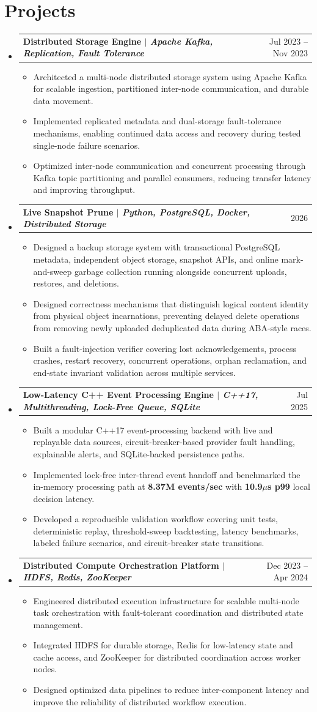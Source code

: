 \documentclass[letterpaper,10pt]{article}
\makeatletter
\newcommand{\resumeItem}[1]{\item\small{{#1\vspace{-2pt}}}}
\newcommand{\resumeProjectHeading}[2]{\item\begin{tabular*}{0.97\textwidth}{l@{\extracolsep{\fill}}r}\small\textbf{#1} & \small#2 \\\end{tabular*}\vspace{-7pt}}
\newcommand{\resumeSubHeadingListStart}{\begin{itemize}[leftmargin=0.12in,label={}]}
\newcommand{\resumeSubHeadingListEnd}{\end{itemize}}
\newcommand{\resumeItemListStart}{\begin{itemize}[leftmargin=0.18in]}
\newcommand{\resumeItemListEnd}{\end{itemize}\vspace{-8pt}}
\makeatother
\begin{document}
\section{Projects}
\resumeSubHeadingListStart
\resumeProjectHeading{Distributed Storage Engine $|$ \emph{Apache Kafka, Replication, Fault Tolerance}}{Jul 2023 -- Nov 2023}
\resumeItemListStart
\resumeItem{Architected a multi-node distributed storage system using Apache Kafka for scalable ingestion, partitioned inter-node communication, and durable data movement.}
\resumeItem{Implemented replicated metadata and dual-storage fault-tolerance mechanisms, enabling continued data access and recovery during tested single-node failure scenarios.}
\resumeItem{Optimized inter-node communication and concurrent processing through Kafka topic partitioning and parallel consumers, reducing transfer latency and improving throughput.}
\resumeItemListEnd
\resumeProjectHeading{Live Snapshot Prune $|$ \emph{Python, PostgreSQL, Docker, Distributed Storage}}{2026}
\resumeItemListStart
\resumeItem{Designed a backup storage system with transactional PostgreSQL metadata, independent object storage, snapshot APIs, and online mark-and-sweep garbage collection running alongside concurrent uploads, restores, and deletions.}
\resumeItem{Designed correctness mechanisms that distinguish logical content identity from physical object incarnations, preventing delayed delete operations from removing newly uploaded deduplicated data during ABA-style races.}
\resumeItem{Built a fault-injection verifier covering lost acknowledgements, process crashes, restart recovery, concurrent operations, orphan reclamation, and end-state invariant validation across multiple services.}
\resumeItemListEnd
\resumeProjectHeading{Low-Latency C++ Event Processing Engine $|$ \emph{C++17, Multithreading, Lock-Free Queue, SQLite}}{Jul 2025}
\resumeItemListStart
\resumeItem{Built a modular C++17 event-processing backend with live and replayable data sources, circuit-breaker-based provider fault handling, explainable alerts, and SQLite-backed persistence paths.}
\resumeItem{Implemented lock-free inter-thread event handoff and benchmarked the in-memory processing path at \textbf{8.37M events/sec} with \textbf{10.9$\mu$s p99} local decision latency.}
\resumeItem{Developed a reproducible validation workflow covering unit tests, deterministic replay, threshold-sweep backtesting, latency benchmarks, labeled failure scenarios, and circuit-breaker state transitions.}
\resumeItemListEnd
\resumeProjectHeading{Distributed Compute Orchestration Platform $|$ \emph{HDFS, Redis, ZooKeeper}}{Dec 2023 -- Apr 2024}
\resumeItemListStart
\resumeItem{Engineered distributed execution infrastructure for scalable multi-node task orchestration with fault-tolerant coordination and distributed state management.}
\resumeItem{Integrated HDFS for durable storage, Redis for low-latency state and cache access, and ZooKeeper for distributed coordination across worker nodes.}
\resumeItem{Designed optimized data pipelines to reduce inter-component latency and improve the reliability of distributed workflow execution.}
\resumeItemListEnd
\resumeSubHeadingListEnd
\end{document}
